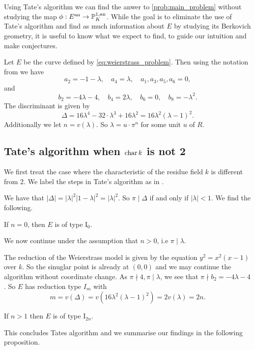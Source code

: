 Using Tate's algorithm we can find the anwer to \cref{prob:main_problem} without studying the map $\phi: E{}^{\text{an}} \to \mathbb{P}^{1, \text{an}}_K$. 
While the goal is to eliminate the use of Tate's algorithm and find as much information about $E$ by studying its Berkovich geometry, 
it is useful to know what we expect to find, to guide our intuition and make conjectures. 

Let $E$ be the curve defined by \eqref{eq:weierstrass_problem}. 
Then using the notation from \cite[p.364]{silvermanAdvancedTopicsArithmetic1994} we have \[
a_2 = -1 - \lambda,\quad a_4 = \lambda, \quad a_1, a_3, a_5, a_6 = 0
,\] 
and \[
b_2 = -4 \lambda - 4, \quad b_4 = 2\lambda, \quad b_6 = 0, \quad b_8 = -\lambda ^2
.\] 
The discriminant is given by \[
	\Delta = 16\lambda^4 - 32\cdot \lambda^3 + 16\lambda^2 = 16 \lambda^2(\lambda - 1)^2
.\] 
Additionally we let $n = v(\lambda)$.
So $\lambda = u \cdot \pi^{n}$ for some unit $u$ of $R$.

\subsection{Tate's algorithm when $\operatorname{char} k$ is not 2} \label{sec:char_k_is_not_2}
We first treat the case where the characteristic of the residue field $k$ is different from 2. 
We label the steps in Tate's algorithm as in \cite[sec.\ IV.9]{silvermanAdvancedTopicsArithmetic1994}.

We have that $|\Delta| = |\lambda|^2 |1-\lambda|^2 = |\lambda|^2 $. 
So $\pi \mid \Delta$ if and only if  $|\lambda| < 1$. 
We find the following. 
\begin{tateconclusion}
	If  $n = 0$, then $E$ is of type $\mathrm I_0$. 
\end{tateconclusion}
We now continue under the assumption that $n > 0$, i.e $\pi \mid \lambda$. 

The reduction of the Weierstrass model is given by the equation $y^2 = x^2 (x - 1)$ over $k$. 
So the sinuglar point is already at $(0, 0)$ and we may continue the algorithm without coordinate change. 
As $\pi \nmid 4, \pi \mid \lambda$, we see that $\pi \nmid b_2 = -4\lambda - 4$. 
So $E$ has reduction type $I_m$ with \[
	m = v(\Delta) = v(16 \lambda^2 (\lambda - 1)^2)  = 2v(\lambda) = 2n
.\]
\begin{tateconclusion}
	If $n > 1$ then $E$ is of type $\mathrm I_{2n}$.
\end{tateconclusion}
This concludes Tates algorithm and we summarise our findings in the following proposition. 

